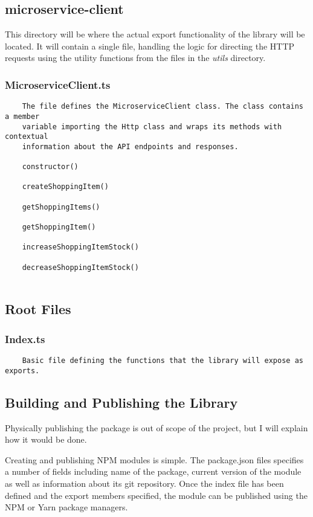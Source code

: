 \subsection{microservice-client}
This directory will be where the actual export functionality of the library will be located. It will contain a single file, handling the logic for directing the HTTP requests using the utility functions from the files in the \emph{utils} directory.
\subsubsection{MicroserviceClient.ts}
\begin{verbatim}
    The file defines the MicroserviceClient class. The class contains a member
    variable importing the Http class and wraps its methods with contextual
    information about the API endpoints and responses. 
    
    constructor()
    
    createShoppingItem()
    
    getShoppingItems()
    
    getShoppingItem()
    
    increaseShoppingItemStock()
    
    decreaseShoppingItemStock()
    
\end{verbatim}
\subsection{Root Files}
\subsubsection{Index.ts}
\begin{verbatim}
    Basic file defining the functions that the library will expose as exports.
\end{verbatim}
\subsection{Building and Publishing the Library}
    Physically publishing the package is out of scope of the project, but I will explain how it would be done.

    Creating and publishing NPM modules is simple. The package.json files specifies a number of fields including name of the package, current version of the module as well as information about its git repository. Once the index file has been defined and the export members specified, the module can be published using the NPM or Yarn package managers.
    
